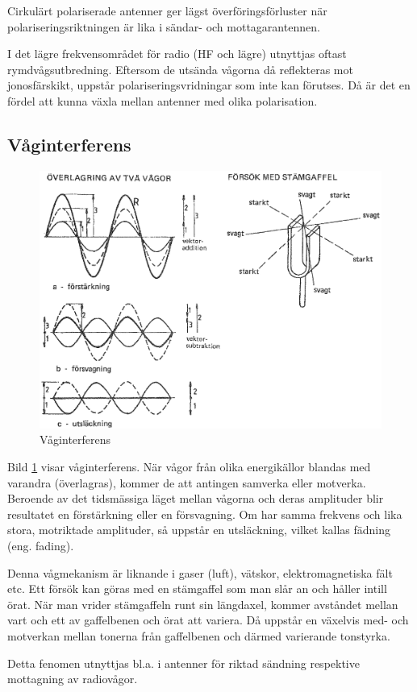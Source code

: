 Cirkulärt polariserade antenner ger lägst överföringsförluster när
polariseringsriktningen är lika i sändar- och mottagarantennen.

I det lägre frekvensområdet för radio (HF och lägre) utnyttjas oftast
rymdvågsutbredning.
Eftersom de utsända vågorna då reflekteras mot jonosfärskikt, uppstår
polariseringsvridningar som inte kan förutses.
Då är det en fördel att kunna växla mellan antenner med olika polarisation.

\subsection{Våginterferens}

\begin{figure}
  \includegraphics[width=\textwidth]{images/cropped_pdfs/bild_2_1-15.pdf}
  \caption{Våginterferens}
  \label{fig:BildII1-15}
\end{figure}

Bild \ref{fig:BildII1-15} visar våginterferens.
När vågor från olika energikällor blandas med varandra (överlagras), kommer
de att antingen samverka eller motverka.
Beroende av det tidsmässiga läget mellan vågorna och deras amplituder blir
resultatet en förstärkning eller en försvagning.
Om har samma frekvens och lika stora, motriktade amplituder, så uppstår en
utsläckning, vilket kallas fädning (eng. fading).

Denna vågmekanism är liknande i gaser (luft), vätskor, elektromagnetiska fält
etc.
Ett försök kan göras med en stämgaffel som man slår an och håller intill örat.
När man vrider stämgaffeln runt sin längdaxel, kommer avståndet mellan
vart och ett av gaffelbenen och örat att variera.
Då uppstår en växelvis med- och motverkan mellan tonerna från gaffelbenen och
därmed varierande tonstyrka.

Detta fenomen utnyttjas bl.a. i antenner för riktad sändning respektive
mottagning av radiovågor.
